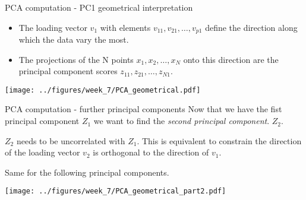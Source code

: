 \documentclass[notes]{beamer}          %
\begin{document}
\begin{frame}{PCA computation - PC1 geometrical interpretation}
\begin{itemize}
\item The loading vector $v_1$ with elements $v_{11}, v_{21}, \dots, v_{p1}$ define the direction along which the data vary the most.
\item The projections of the N points $x_1, x_2, \dots, x_N$ onto this direction are the principal component scores $z_{11}, z_{21}, \dots, z_{N1}$.
\end{itemize}

\begin{center}
\texttt{[image: ../figures/week\_7/PCA\_geometrical.pdf]}  
\end{center}
\end{frame}

\begin{frame}{PCA computation - further principal components}
Now that we have the fist principal component $Z_1$ we want to find the \textit{second principal component}. $Z_2$. 

\vspace{2mm} 

$Z_2$ needs to be uncorrelated with $Z_1$. This is equivalent to constrain the direction of the loading vector $v_2$  is orthogonal to the direction of $v_1$.

\vspace{2mm} 
 
 Same for the following principal components.
 
 \begin{center}
\texttt{[image: ../figures/week\_7/PCA\_geometrical\_part2.pdf]}  
\end{center}
 

\end{frame}
\end{document}
